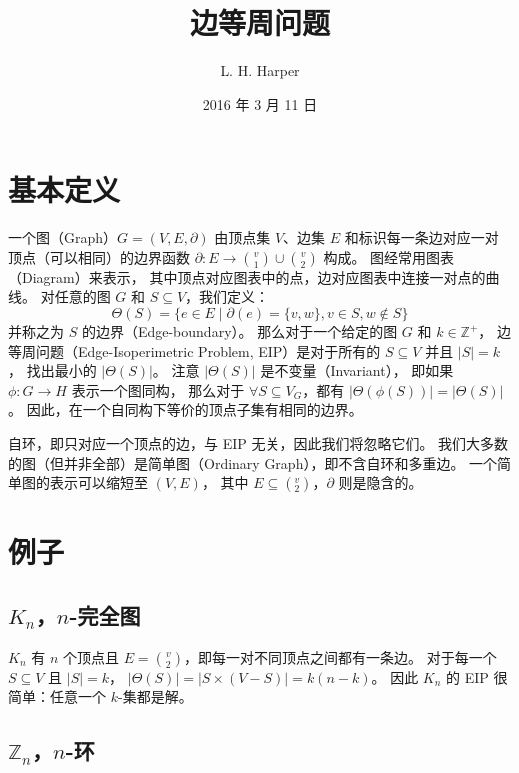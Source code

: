 \documentclass[12pt, a4paper]{article}
\author{L. H. Harper}
\date{2016 年 3 月 11 日}
\begin{document}
\title{边等周问题}
\maketitle

\section{基本定义}
\label{Section 1}

一个图（Graph）$G = (V, E, \partial)$ 由顶点集 $V$、边集 $E$
和标识每一条边对应一对顶点（可以相同）的边界函数
$\partial \colon E \rightarrow \binom{v}{1} \cup \binom{v}{2}$ 构成。
图经常用图表（Diagram）来表示，
其中顶点对应图表中的点，边对应图表中连接一对点的曲线。
对任意的图 $G$ 和 $S \subseteq V$，我们定义：
\begin{equation*}
\Theta(S) = \{e \in E \mid \partial(e) = \{v, w\}, v \in S, w \notin S\}
\end{equation*}
并称之为 $S$ 的边界（Edge-boundary）。
那么对于一个给定的图 $G$ 和 $k \in \mathbb{Z}^+$，
边等周问题（Edge-Isoperimetric Problem, EIP）是对于所有的 $S \subseteq V$ 并且 $|S| = k$，
找出最小的 $|\Theta(S)|$。
注意 $|\Theta(S)|$ 是不变量（Invariant），
即如果 $\phi \colon G \rightarrow H$ 表示一个图同构，
那么对于 $\forall S \subseteq V_G$，都有 $|\Theta(\phi(S))| = |\Theta(S)|$。
因此，在一个自同构下等价的顶点子集有相同的边界。

自环，即只对应一个顶点的边，与 EIP 无关，因此我们将忽略它们。
我们大多数的图（但并非全部）是简单图（Ordinary Graph），即不含自环和多重边。
一个简单图的表示可以缩短至 $(V, E)$，
其中 $E \subseteq (_2^v)$，$\partial$ 则是隐含的。

\section{例子}
\label{Section 2}

\subsection{$K_n$，$n$-完全图}
\label{Subsection 2.1}

$K_n$ 有 $n$ 个顶点且 $E = \binom{v}{2}$，即每一对不同顶点之间都有一条边。
对于每一个 $S \subseteq V$ 且 $|S| = k$，
$|\Theta(S)| = |S \times (V − S)| = k(n − k)$。
因此 $K_n$ 的 EIP 很简单：任意一个 $k$-集都是解。

\subsection{$\mathbb{Z}_n$，$n$-环}
\label{Subsection 2.2}
\end{document}
